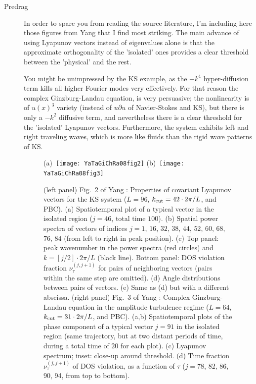 \begin{description}
\item[Predrag]
In order to spare you from reading the source literature, I'm including here
those figures from Yang \etal{} that I find most striking.
The main advance of using Lyapunov vectors instead of eigenvalues alone
is that the approximate orthogonality of the 'isolated' ones provides a clear
threshold between the 'physical' and the rest.

You might be unimpressed by the KS example, as the $-k^4$ hyper-diffusion
term kills all higher Fourier modes very effectively. For that reason the
complex Ginzburg-Landau equation, 
is very persuasive; the nonlinearity is
of $u(x)^3$ variety (instead of $u \partial u$ of Navier-Stokes and
KS), but there is only a $-k^2$ diffusive term, and nevertheless there
is a clear threshold for the 'isolated' Lyapunov vectors. Furthermore,
the system exhibits left and right traveling waves, which is more like
fluids than the rigid wave patterns of KS.

\begin{figure}
 (a)~\texttt{[image: YaTaGiChRa08fig2]}
 (b)~\texttt{[image: YaTaGiChRa08fig3]}
\caption{
(left panel)
Fig.~2 of Yang \etal{}:
Properties of covariant Lyapunov vectors for the KS system
($L = 96$, $k_{\rm cut} = 42 \cdot 2\pi/L$, and PBC).
(a) Spatiotemporal plot of a typical vector in the isolated region
($j=46$, total time $100$).
(b) Spatial power spectra of vectors of indices
$j = 1$, $16$, $32$, $38$, $44$, $52$, $60$, $68$, $76$, $84$
(from left to right in peak position).
(c) Top panel: peak wavenumber in the power spectra (red circles)
and $k = [j/2] \cdot 2\pi/L$ (black line).
Bottom panel: DOS violation fraction $\nu^{(j,j+1)}_\tau$ for pairs of
neighboring vectors (pairs within the same step are omitted).
(d) Angle distributions between pairs of vectors.
(e) Same as (d) but with a different abscissa.
(right panel)
Fig.~3 of Yang \etal{}:
Complex Ginzburg-Landau equation in the amplitude turbulence regime
($L = 64$, $k_{\rm cut} = 31 \cdot 2\pi/L$, and PBC).
(a,b) Spatiotemporal plots of the phase component of a typical vector $j = 91$ in the isolated region
(same trajectory, but at two distant periods of time, during a total time of $20$ for each plot).
(c) Lyapunov spectrum; inset: close-up around threshold.
(d) Time fraction $\nu^{(j,j+1)}_\tau$ of DOS violation, as a function of $\tau$
($j=78$, 82, 86, 90, 94, from top to bottom).
}
\label{fig:lyapSpecCLG}
\end{figure}

\end{description}



